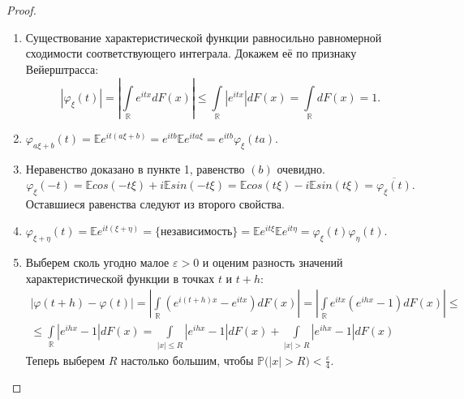 \begin{proof}
    \begin{enumerate}
        \item 
            Существование характеристической функции равносильно равномерной сходимости соответствующего интеграла. 
            Докажем её по признаку Вейерштрасса:
            \begin{equation*}
                \left|\varphi_{\xi}(t)\right|=\left|\int\limits_{\mathbb{R}} e^{i t x} d F(x)\right| 
                \leqslant \int\limits_{\mathbb{R}}\left|e^{i t x}\right| d F(x)=\int\limits_{\mathbb{R}} d F(x)=1.
            \end{equation*}
        \item 
            $\varphi_{a \xi+b}(t) 
            = \mathbb{E}e^{i t(a \xi+b)}
            = e^{i t b} \mathbb{E}e^{i t a \xi}
            = e^{i t b} \varphi_{\xi}(t a)$.
        \item 
            Неравенство доказано в пункте 1, равенство $(b)$ очевидно.
            \begin{equation*}
                \varphi_{\xi}(-t) = \mathbb{E}cos(-t \xi) + i\mathbb{E}sin(-t \xi) 
                = \mathbb{E}cos(t \xi) - i\mathbb{E}sin(t \xi) = \overline{\varphi_{\xi}(t)}.
            \end{equation*}
            Оставшиеся равенства следуют из второго свойства.
        \item 
            $\varphi_{\xi + \eta}(t) 
            = \mathbb{E}e^{it(\xi + \eta)} 
            = \text{\{независимость\}}
            = \mathbb{E}e^{it\xi}\mathbb{E}e^{it\eta}
            = \varphi_{\xi}(t)\varphi_{\eta}(t).$
        \item 
            Выберем сколь угодно малое $\varepsilon > 0$ и оценим разность значений характеристической функции в точках $t$ и $t + h$:
            \begin{multline*}
                \bigl| \varphi(t+h)-\varphi(t) \bigr| 
                = \left|\int\limits_{\mathbb{R}} \left(e^{i(t+h) x}-e^{i tx}\right) d F(x)\right|
                = \left|\int\limits_{\mathbb{R}} e^{i t x}\left(e^{i h x}-1\right) d F(x)\right| \leqslant \\
                \leqslant \int\limits_{\mathbb{R}} \left|e^{i h x}-1\right| d F(x)=\int\limits_{|x| \leqslant R}\left|e^{i h x}-1\right| d F(x)+\int\limits_{|x|>R}\left|e^{i h x}-1\right| d F(x)
            \end{multline*}
            Теперь выберем $R$ настолько большим, чтобы $\mathbb{P}\bigl(|x|>R\bigr) < \frac{\varepsilon}{4}$. 

\end{enumerate}
\end{proof}
